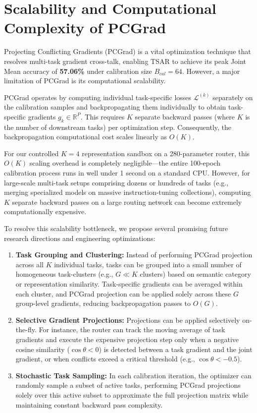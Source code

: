 \section{Scalability and Computational Complexity of PCGrad}
\label{sec:pcgrad_complexity}

Projecting Conflicting Gradients (PCGrad) is a vital optimization technique that resolves
multi-task gradient cross-talk, enabling TSAR to achieve its peak Joint Mean accuracy of
\textbf{57.06\%} under calibration size $B_{cal}=64$. However, a major limitation of PCGrad is its
computational scalability.

PCGrad operates by computing individual task-specific losses $\mathcal{L}^{(k)}$ separately on the
calibration samples and backpropagating them individually to obtain task-specific gradients $g_k \in
\mathbb{R}^P$. This requires $K$ separate backward passes (where $K$ is the number of downstream
tasks) per optimization step. Consequently, the backpropagation computational cost scales linearly
as $O(K)$.

For our controlled $K=4$ representation sandbox on a 280-parameter router, this $O(K)$ scaling
overhead is completely negligible—the entire 100-epoch calibration process runs in well under 1
second on a standard CPU. However, for large-scale multi-task setups comprising dozens or hundreds
of tasks (e.g., merging specialized models on massive instruction-tuning collections), computing $K$
separate backward passes on a large routing network can become extremely computationally expensive.

To resolve this scalability bottleneck, we propose several promising future research directions and
engineering optimizations:
\begin{enumerate}
    \item \textbf{Task Grouping and Clustering:} Instead of performing PCGrad projection across all
$K$ individual tasks, tasks can be grouped into a small number of homogeneous task-clusters (e.g.,
$G \ll K$ clusters) based on semantic category or representation similarity. Task-specific gradients
can be averaged within each cluster, and PCGrad projection can be applied solely across these $G$
group-level gradients, reducing backpropagation passes to $O(G)$.
    \item \textbf{Selective Gradient Projections:} Projections can be applied selectively
on-the-fly. For instance, the router can track the moving average of task gradients and execute the
expensive projection step only when a negative cosine similarity ($\cos\theta < 0$) is detected
between a task gradient and the joint gradient, or when conflicts exceed a critical threshold (e.g.,
$\cos\theta < -0.5$).
    \item \textbf{Stochastic Task Sampling:} In each calibration iteration, the optimizer can
randomly sample a subset of active tasks, performing PCGrad projections solely over this active
subset to approximate the full projection matrix while maintaining constant backward pass
complexity.
\end{enumerate}

